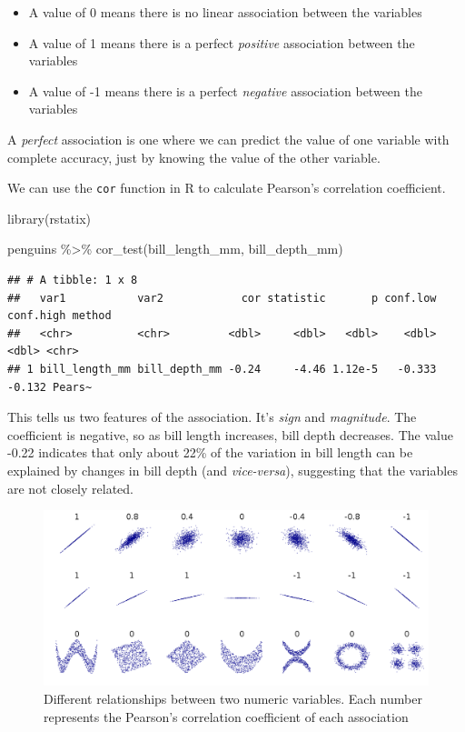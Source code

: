 \documentclass[
]{book}
\newenvironment{Shaded}{\begin{snugshade}}{\end{snugshade}}
\newcommand{\FunctionTok}[1]{\textcolor[rgb]{0.00,0.00,0.00}{#1}}
\newcommand{\NormalTok}[1]{#1}
\newcommand{\SpecialCharTok}[1]{\textcolor[rgb]{0.00,0.00,0.00}{#1}}
\begin{document}
\begin{itemize}
\item
  A value of 0 means there is no linear association between the variables
\item
  A value of 1 means there is a perfect \emph{positive} association between the variables
\item
  A value of -1 means there is a perfect \emph{negative} association between the variables
\end{itemize}

A \emph{perfect} association is one where we can predict the value of one variable with complete accuracy, just by knowing the value of the other variable.

We can use the \texttt{cor} function in R to calculate Pearson's correlation coefficient.

\begin{Shaded}
\begin{Highlighting}[]
\FunctionTok{library}\NormalTok{(rstatix)}

\NormalTok{penguins }\SpecialCharTok{\%\textgreater{}\%} 
  \FunctionTok{cor\_test}\NormalTok{(bill\_length\_mm, bill\_depth\_mm)}
\end{Highlighting}
\end{Shaded}

\begin{verbatim}
## # A tibble: 1 x 8
##   var1           var2            cor statistic       p conf.low conf.high method
##   <chr>          <chr>         <dbl>     <dbl>   <dbl>    <dbl>     <dbl> <chr> 
## 1 bill_length_mm bill_depth_mm -0.24     -4.46 1.12e-5   -0.333    -0.132 Pears~
\end{verbatim}

This tells us two features of the association. It's \emph{sign} and \emph{magnitude}. The coefficient is negative, so as bill length increases, bill depth decreases. The value -0.22 indicates that only about 22\% of the variation in bill length can be explained by changes in bill depth (and \emph{vice-versa}), suggesting that the variables are not closely related.

\begin{figure}
\includegraphics[width=0.8\linewidth]{images/correlation_examples} \caption{Different relationships between two numeric variables. Each number represents the Pearson's correlation coefficient of each association}\label{fig:unnamed-chunk-310}
\end{figure}
\end{document}
